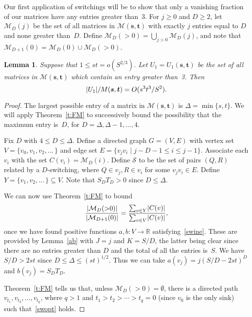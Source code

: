 \documentclass[12pt]{article}
\def\Reals{{\mathbb{R}}}
\newtheorem{lemma}[theorem]{Lemma}
\numberwithin{equation}{section}
\def\M{{\mathcal{M}}}
\def\S{{\mathcal{S}}}
\def\svec{{\boldsymbol{s}}}
\def\tvec{{\boldsymbol{t}}}
\def\Deltait{{\mathit{\Delta}}}
\def\Mst{{\M(\svec,\tvec)}}
\begin{document}
\medskip
Our first application of switchings will be to show that only
a vanishing fraction of our matrices have any entries greater
than~3.
For $j\ge 0$ and $D\ge 2$, let $\M_D(j)$ be the set of all
matrices in $\Mst$ with exactly $j$ entries equal to $D$ and none
greater than~$D$. Define $\M_D({>}0)=\bigcup_{j>0}\M_D(j)$,
and note that $\M_{D+1}(0) = \M_D(0)\cup\M_D({>}0)$.

\begin{lemma}\label{no4}
Suppose that $1\leq st=o(S^{2/3})$.
Let $U_1=U_1(\svec,\tvec)$ be the set of all matrices in $\Mst$
which contain an entry greater than~3.  Then
\[ 
 \card{U_1}/M(\svec,\tvec) = O(s^3t^3/S^2).
 \vadjust{\vskip-1ex}
\]
\end{lemma}

\begin{proof}
The largest possible entry of a matrix in $\Mst$
is $\Deltait = \min\{ s,t\}$. We will apply
Theorem~\ref{t:FM} to successively bound the possibility that the
maximum entry is~$D$, for $D=\Deltait,\Deltait-1,\ldots,4$.


\medskip

Fix $D$ with $4\le D\le\Deltait$.  
Define a directed graph $G=(V,E)$ with vertex set 
$V = \{ v_0, v_1, v_2,\ldots\,\}$
and edge set  $E=\{v_jv_i \mid  j-D-1\leq i\leq j-1\}$.
Associate each $v_i$ with the set $C(v_i) = \M_D(i)$.
Define $\S$ to be the set of pairs $(Q,R)$ related by a
$D$-switching, where $Q\in v_j, R\in v_i$ for some $v_jv_i\in E$.
Define $Y=\{ v_1, v_2,\ldots\,\}\subseteq V$.
Note that $S_DT_D>0$ since $D\le\Deltait$.

We can now use Theorem~\ref{t:FM} to bound
\[
 \frac{\card{\M_D({>}0)}}{\card{\M_{D+1}(0)}} = 
 \frac{\sum_{v\in Y}\card{C(v)}}{\sum_{v\in V}\card{C(v)}},
\]
once we have found
positive functions $a,b:V\to\Reals$ satisfying~\eqref{swine}.
These are provided by Lemma~\ref{ab} with $J=j$ and
$K=S/D$, the latter being clear since there are no entries
greater than $D$ and the total of all the entries is~$S$.
We have $S/D > 2st$ since 
$D\le\Deltait\le (st)^{1/2}$.
Thus we can take $a(v_j) = j(S/D - 2st)^D$ and
$b(v_j) = S_DT_D$.

Theorem~\ref{t:FM} tells us that, unless $\M_D({>}0)=\emptyset$,
there is a directed path $v_{t_1},v_{t_2},\ldots,v_{t_q}$,
where $q>1$ and $t_1>t_2>\cdots>t_q=0$ (since $v_0$ is
the only sink) such that~\eqref{swopt} holds.


\end{proof}
\end{document}
